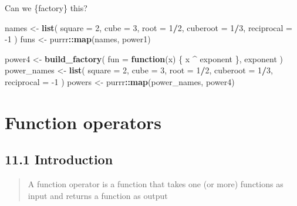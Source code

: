 \documentclass[]{book}
\newenvironment{Shaded}{\begin{snugshade}}{\end{snugshade}}
\newcommand{\ControlFlowTok}[1]{\textcolor[rgb]{0.13,0.29,0.53}{\textbf{#1}}}
\newcommand{\DataTypeTok}[1]{\textcolor[rgb]{0.13,0.29,0.53}{#1}}
\newcommand{\DecValTok}[1]{\textcolor[rgb]{0.00,0.00,0.81}{#1}}
\newcommand{\KeywordTok}[1]{\textcolor[rgb]{0.13,0.29,0.53}{\textbf{#1}}}
\newcommand{\NormalTok}[1]{#1}
\newcommand{\OperatorTok}[1]{\textcolor[rgb]{0.81,0.36,0.00}{\textbf{#1}}}
\newcommand{\StringTok}[1]{\textcolor[rgb]{0.31,0.60,0.02}{#1}}
\begin{document}
Can we \{factory\} this?

\begin{Shaded}
\begin{Highlighting}[]
\NormalTok{names <-}\StringTok{ }\KeywordTok{list}\NormalTok{(}
  \DataTypeTok{square =} \DecValTok{2}\NormalTok{, }
  \DataTypeTok{cube =} \DecValTok{3}\NormalTok{, }
  \DataTypeTok{root =} \DecValTok{1}\OperatorTok{/}\DecValTok{2}\NormalTok{, }
  \DataTypeTok{cuberoot =} \DecValTok{1}\OperatorTok{/}\DecValTok{3}\NormalTok{, }
  \DataTypeTok{reciprocal =} \DecValTok{-1}
\NormalTok{)}
\NormalTok{funs <-}\StringTok{ }\NormalTok{purrr}\OperatorTok{::}\KeywordTok{map}\NormalTok{(names, power1)}
\end{Highlighting}
\end{Shaded}

\begin{Shaded}
\begin{Highlighting}[]
\NormalTok{power4 <-}\StringTok{ }\KeywordTok{build_factory}\NormalTok{(}
  \DataTypeTok{fun =} \ControlFlowTok{function}\NormalTok{(x) \{}
\NormalTok{    x }\OperatorTok{^}\StringTok{ }\NormalTok{exponent}
\NormalTok{  \},}
\NormalTok{  exponent}
\NormalTok{)}
\NormalTok{power_names <-}\StringTok{ }\KeywordTok{list}\NormalTok{(}
  \DataTypeTok{square =} \DecValTok{2}\NormalTok{,}
  \DataTypeTok{cube =} \DecValTok{3}\NormalTok{,}
  \DataTypeTok{root =} \DecValTok{1}\OperatorTok{/}\DecValTok{2}\NormalTok{,}
  \DataTypeTok{cuberoot =} \DecValTok{1}\OperatorTok{/}\DecValTok{3}\NormalTok{,}
  \DataTypeTok{reciprocal =} \DecValTok{-1}
\NormalTok{)}
\NormalTok{powers <-}\StringTok{ }\NormalTok{purrr}\OperatorTok{::}\KeywordTok{map}\NormalTok{(power_names, power4)}
\end{Highlighting}
\end{Shaded}

\hypertarget{function-operators}{%
\chapter{Function operators}\label{function-operators}}

\hypertarget{introduction-1}{%
\section*{11.1 Introduction}\label{introduction-1}}

\begin{quote}
A function operator is a function that takes one (or more) functions as input and returns a function as output
\end{quote}
\end{document}
